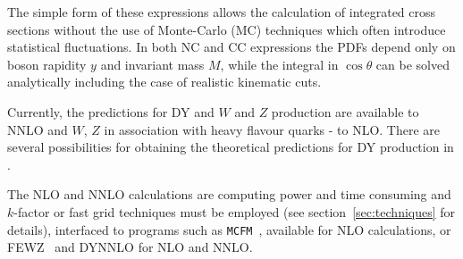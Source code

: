 The simple form of these expressions allows the calculation of integrated
cross sections without the use of Monte-Carlo (MC) techniques which often 
introduce statistical fluctuations.
In both NC and CC expressions the PDFs depend only on boson rapidity \(y\) and
invariant mass \(M\), while
the integral in \(\cos\theta\) can be solved analytically
including the case of realistic kinematic cuts.
%

Currently, the predictions for DY and $W$ and $Z$ production are available
to NNLO and $W$, $Z$ in association with heavy flavour quarks - to NLO. There are several possibilities 
for obtaining the theoretical
predictions for DY production in \fitter. 

The NLO and NNLO calculations are computing power and time consuming
and $k$-factor or fast grid techniques must be employed (see section~\ref{sec:techniques}
for details), interfaced to programs such as
\texttt{MCFM}~\cite{Campbell:1999ah,Campbell:2000je,Campbell:2010ff}, 
available for NLO calculations, or 
FEWZ~\cite{FEWZ} and DYNNLO \cite{DYNNLO} for NLO and NNLO.
 





